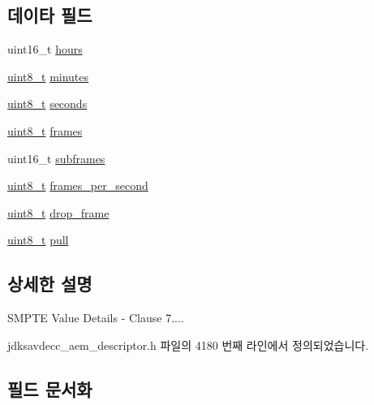 \subsection*{데이타 필드}
\begin{DoxyCompactItemize}
\item 
uint16\+\_\+t \hyperlink{structjdksavdecc__values__smpte__time_a014d9515f8559b76acebf4a055130385}{hours}
\item 
\hyperlink{stdint_8h_aba7bc1797add20fe3efdf37ced1182c5}{uint8\+\_\+t} \hyperlink{structjdksavdecc__values__smpte__time_a7acca8be0094a19be6e308ac05924c4f}{minutes}
\item 
\hyperlink{stdint_8h_aba7bc1797add20fe3efdf37ced1182c5}{uint8\+\_\+t} \hyperlink{structjdksavdecc__values__smpte__time_a46729a903be1a03cdb248fb48d84d4f5}{seconds}
\item 
\hyperlink{stdint_8h_aba7bc1797add20fe3efdf37ced1182c5}{uint8\+\_\+t} \hyperlink{structjdksavdecc__values__smpte__time_ae45acaaf86f2d2177e4daa08f28ded47}{frames}
\item 
uint16\+\_\+t \hyperlink{structjdksavdecc__values__smpte__time_a8f5ca74703be041d4572e5ae886bd487}{subframes}
\item 
\hyperlink{stdint_8h_aba7bc1797add20fe3efdf37ced1182c5}{uint8\+\_\+t} \hyperlink{structjdksavdecc__values__smpte__time_a216a45b8a2d7b6aede4316aad0142121}{frames\+\_\+per\+\_\+second}
\item 
\hyperlink{stdint_8h_aba7bc1797add20fe3efdf37ced1182c5}{uint8\+\_\+t} \hyperlink{structjdksavdecc__values__smpte__time_a9007da8de1dceae90e4e7b85f540333c}{drop\+\_\+frame}
\item 
\hyperlink{stdint_8h_aba7bc1797add20fe3efdf37ced1182c5}{uint8\+\_\+t} \hyperlink{structjdksavdecc__values__smpte__time_a717d3a27db8fc0b8bbb7130fcf9e5c73}{pull}
\end{DoxyCompactItemize}


\subsection{상세한 설명}
S\+M\+P\+TE Value Details -\/ Clause 7.... 

jdksavdecc\+\_\+aem\+\_\+descriptor.\+h 파일의 4180 번째 라인에서 정의되었습니다.



\subsection{필드 문서화}
